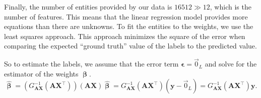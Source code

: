 \documentclass{article}
\begin{document}

Finally, the number of entities provided by our data is $\num{16 512} \gg 12$, which is the number of features. This means that the linear regression model provides more equations than there are unknowns. To fit the entities to the weights, we use the least squares approach. This approach minimizes the square of the error when comparing the expected ``ground truth'' value of the labels to the predicted value.

So to estimate the labels, we assume that the error term $\boldsymbol\epsilon = \vec0_L$ and solve for the estimator of the weights $\boldsymbol\upbeta$.
\begin{equation}
    \hat{\boldsymbol\upbeta} = \left(G_{\mathbf{AX}}^{-1} \left(\mathbf{AX}^\intercal\right)\right) (\mathbf{AX})\hat{\boldsymbol\upbeta} = G_{\mathbf{AX}}^{-1} \left(\mathbf{AX}^\intercal\right) (\mathbf{y} - \vec{0}_L) = G_{\mathbf{AX}}^{-1} \left(\mathbf{AX}^\intercal\right) \mathbf{y}.
\end{equation}
\end{document}
